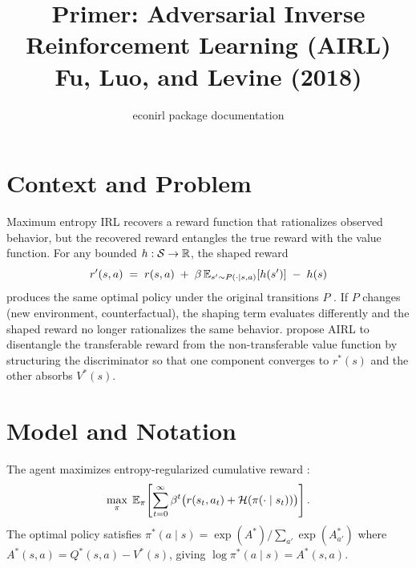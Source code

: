 \documentclass[11pt]{article}
\title{Primer: Adversarial Inverse Reinforcement Learning (AIRL)\\[3pt]
\large Fu, Luo, and Levine (2018)}
\author{econirl package documentation}
\date{}
\begin{document}
\maketitle
\vspace{-0.5em}

\section{Context and Problem}

Maximum entropy IRL \citep{ziebart2010} recovers a reward function that rationalizes observed behavior, but the recovered reward entangles the true reward with the value function.
For any bounded $h : \mathcal{S} \to \mathbb{R}$, the shaped reward
\begin{equation}
\label{eq:shaping}
r'(s,a) \;=\; r(s,a) \;+\; \beta\, \mathbb{E}_{s' \sim P(\cdot|s,a)}[h(s')] \;-\; h(s)
\end{equation}
produces the same optimal policy under the original transitions $P$ \citep{ng1999}.
If $P$ changes (new environment, counterfactual), the shaping term evaluates differently and the shaped reward no longer rationalizes the same behavior.
\citet{fu2018} propose AIRL to disentangle the transferable reward from the non-transferable value function by structuring the discriminator so that one component converges to $r^*(s)$ and the other absorbs $V^*(s)$.

\section{Model and Notation}

\commonnotation

The agent maximizes entropy-regularized cumulative reward \citep{ziebart2010}:
\begin{equation}
\label{eq:objective}
\max_\pi \; \mathbb{E}_\pi\!\left[\sum_{t=0}^{\infty} \beta^t \big(r(s_t, a_t) + \mathcal{H}(\pi(\cdot \mid s_t))\big)\right].
\end{equation}
The optimal policy satisfies $\pi^*(a \mid s) = \exp(A^*) / \sum_{a'} \exp(A^*_{a'})$ where $A^*(s,a) = Q^*(s,a) - V^*(s)$, giving $\log \pi^*(a \mid s) = A^*(s,a)$.
\end{document}
